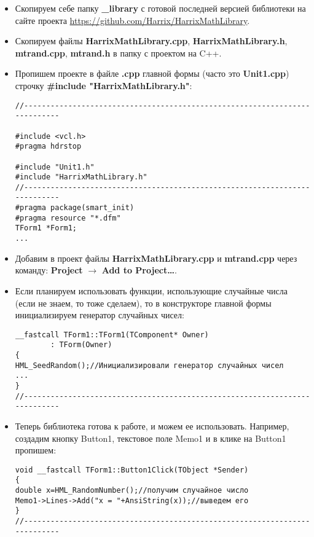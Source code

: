 \begin{itemize}
\item Скопируем себе папку \textbf{\_library} с готовой последней версией библиотеки на сайте проекта \href{https://github.com/Harrix/HarrixMathLibrary}{https://github.com/Harrix/HarrixMathLibrary}.

\item Скопируем файлы \textbf{HarrixMathLibrary.cpp}, \textbf{HarrixMathLibrary.h}, \textbf{mtrand.cpp}, \textbf{mtrand.h} в папку с проектом на C++.

\item Пропишем проекте в файле \textbf{.cpp} главной формы (часто это \textbf{Unit1.cpp}) строчку \textbf{\#include "HarrixMathLibrary.h"}:
\begin{lstlisting}[label=install_code_01,caption=Подключение библиотеки]
//---------------------------------------------------------------------------

#include <vcl.h>
#pragma hdrstop

#include "Unit1.h"
#include "HarrixMathLibrary.h"
//---------------------------------------------------------------------------
#pragma package(smart_init)
#pragma resource "*.dfm"
TForm1 *Form1;
...
\end{lstlisting}

\item Добавим в проект файлы \textbf{HarrixMathLibrary.cpp} и \textbf{mtrand.cpp} через команду: \textbf{Project} $\rightarrow$ \textbf{Add to Project\dots}.

\item Если планируем использовать функции, использующие случайные числа (если не знаем, то тоже сделаем), то в конструкторе главной формы инициализируем генератор случайных чисел:
\begin{lstlisting}[label=install_code_02,caption=Инициализация генератора случайных чисел]
__fastcall TForm1::TForm1(TComponent* Owner)
        : TForm(Owner)
{
HML_SeedRandom();//Инициализировали генератор случайных чисел
...
}
//---------------------------------------------------------------------------
\end{lstlisting}

\item Теперь библиотека готова к работе, и можем ее использовать. Например, создадим кнопку Button1, текстовое поле Memo1 и в клике на Button1 пропишем:
\begin{lstlisting}[label=install_code_03,caption=Пример использования]
void __fastcall TForm1::Button1Click(TObject *Sender)
{
double x=HML_RandomNumber();//получим случайное число
Memo1->Lines->Add("x = "+AnsiString(x));//выведем его
}
//---------------------------------------------------------------------------
\end{lstlisting}
\end{itemize}

